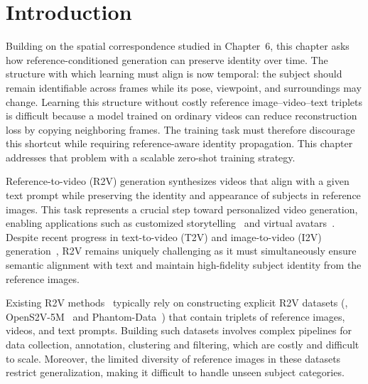 \section{Introduction}
\label{saber:sec:introduction}

Building on the spatial correspondence studied in Chapter~6, this chapter asks how reference-conditioned generation can preserve identity over time.
The structure with which learning must align is now temporal: the subject should remain identifiable across frames while its pose, viewpoint, and surroundings may change. Learning this structure without costly reference image--video--text triplets is difficult because a model trained on ordinary videos can reduce reconstruction loss by copying neighboring frames. The training task must therefore discourage this shortcut while requiring reference-aware identity propagation.
This chapter addresses that problem with a scalable zero-shot training strategy.

Reference-to-video (R2V) generation synthesizes videos that align with a given text prompt while preserving the identity and appearance of subjects in reference images.
This task represents a crucial step toward personalized video generation, enabling applications such as customized storytelling~\citep{rahman2023make, wang2024evolving, zhou2024storydiffusion} and virtual avatars~\citep{guo2024liveportrait, yuan2025identity, gao2025identity, shen2025identity}.
Despite recent progress in text-to-video (T2V) and image-to-video (I2V) generation~\citep{hong2022cogvideo, yang2024cogvideox, liu2024mardini, hacohen2024ltx, kong2024hunyuanvideo, wan2025wan, gao2025seedance, zhang2025waver}, R2V remains uniquely challenging as it must simultaneously ensure semantic alignment with text and maintain high-fidelity subject identity from the reference images.

Existing R2V methods~\citep{zhou2024sugar, liu2025phantom, jiang2025vace, deng2025magref, fei2025skyreels, hu2025polyvivid, xue2025stand, li2025bindweave} typically rely on constructing explicit R2V datasets (\eg, OpenS2V-5M~\citep{yuan2025opens2v} and Phantom-Data~\citep{chen2025phantom}) that contain triplets of reference images, videos, and text prompts.
Building such datasets involves complex pipelines for data collection, annotation, clustering and filtering, which are costly and difficult to scale.
Moreover, the limited diversity of reference images in these datasets restrict generalization, making it difficult to handle unseen subject categories.

